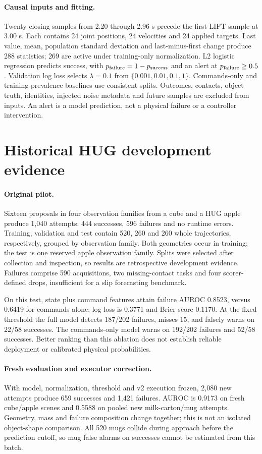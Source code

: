 \documentclass[10pt,letterpaper]{article}
\begin{document}
\paragraph{Causal inputs and fitting.}
Twenty closing samples from 2.20 through 2.96 s precede the first LIFT sample
at 3.00 s. Each contains 24 joint positions, 24 velocities and 24 applied targets.
Last value, mean, population standard deviation and last-minus-first change
produce 288 statistics; 269 are active under training-only normalization.
L2 logistic regression predicts success, with
$p_{\rm failure}=1-p_{\rm success}$ and an alert at $p_{\rm failure}\geq0.5$.
Validation log loss selects $\lambda=0.1$ from
$\{0.001,0.01,0.1,1\}$. Commands-only and training-prevalence baselines use
consistent splits. Outcomes, contacts, object truth, identities, injected noise
metadata and future samples are excluded from inputs. An alert is a model
prediction, not a physical failure or a controller intervention.

\section{Historical HUG development evidence}
\paragraph{Original pilot.}
Sixteen proposals in four observation families from a cube and a HUG apple
produce 1,040 attempts: 444 successes, 596 failures and no runtime errors.
Training, validation and test contain 520, 260 and 260 whole trajectories,
respectively, grouped by observation family. Both geometries occur in training;
the test is one reserved apple observation family. Splits were selected after
collection and inspection, so results are retrospective development evidence.
Failures comprise 590 acquisitions, two missing-contact tasks and four
scorer-defined drops, insufficient for a slip forecasting benchmark.

On this test, state plus command features attain failure AUROC 0.8523, versus
0.6419 for commands alone; log loss is 0.3771 and Brier score 0.1170.
At the fixed threshold the full model detects 187/202 failures, misses 15,
and falsely warns on 22/58 successes. The commands-only model warns on
192/202 failures and 52/58 successes. Better ranking than this ablation does
not establish reliable deployment or calibrated physical probabilities.

\paragraph{Fresh evaluation and executor correction.}
With model, normalization, threshold and v2 execution frozen, 2,080 new attempts
produce 659 successes and 1,421 failures. AUROC is 0.9173 on fresh cube/apple
scenes and 0.5588 on pooled new milk-carton/mug attempts. Geometry, mass and
failure composition change together; this is not an isolated object-shape
comparison. All 520 mugs collide during approach before the prediction cutoff,
so mug false alarms on successes cannot be estimated from this batch.
\end{document}
